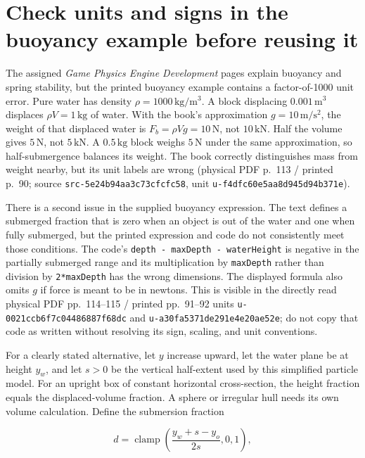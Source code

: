 \section{Check units and signs in the buoyancy example before reusing it}\label{06-engine-ii-ch047-check-units-and-signs-in-the-buoyancy-example-before-reusing-it}

The assigned \emph{Game Physics Engine Development} pages explain buoyancy and spring stability, but the printed buoyancy example contains a factor-of-1000 unit error. Pure water has density \(\rho=1000\,\mathrm{kg/m^3}\). A block displacing \(0.001\,\mathrm{m^3}\) displaces \(\rho V=1\,\mathrm{kg}\) of water. With the book's approximation \(g=10\,\mathrm{m/s^2}\), the weight of that displaced water is \(F_b=\rho Vg=10\,\mathrm{N}\), not \(10\,\mathrm{kN}\). Half the volume gives \(5\,\mathrm{N}\), not \(5\,\mathrm{kN}\). A \(0.5\,\mathrm{kg}\) block weighs \(5\,\mathrm{N}\) under the same approximation, so half-submergence balances its weight. The book correctly distinguishes mass from weight nearby, but its unit labels are wrong (physical PDF p.~113 / printed p.~90; source \texttt{src-5e24b94aa3c73cfcfc58}, unit \texttt{u-f4dfc60e5aa8d945d94b371e}).

There is a second issue in the supplied buoyancy expression. The text defines a submerged fraction that is zero when an object is out of the water and one when fully submerged, but the printed expression and code do not consistently meet those conditions. The code's \texttt{depth\ -\ maxDepth\ -\ waterHeight} is negative in the partially submerged range and its multiplication by \texttt{maxDepth} rather than division by \texttt{2*maxDepth} has the wrong dimensions. The displayed formula also omits \(g\) if force is meant to be in newtons. This is visible in the directly read physical PDF pp.~114--115 / printed pp.~91--92 units \texttt{u-0021ccb6f7c04486887f68dc} and \texttt{u-a30fa5371de291e4e20ae52e}; do not copy that code as written without resolving its sign, scaling, and unit conventions.

For a clearly stated alternative, let \(y\) increase upward, let the water plane be at height \(y_w\), and let \(s>0\) be the vertical half-extent used by this simplified particle model. For an upright box of constant horizontal cross-section, the height fraction equals the displaced-volume fraction. A sphere or irregular hull needs its own volume calculation. Define the submersion fraction

\[
d=\operatorname{clamp}\!\left(\frac{y_w+s-y_o}{2s},0,1\right),
\]

